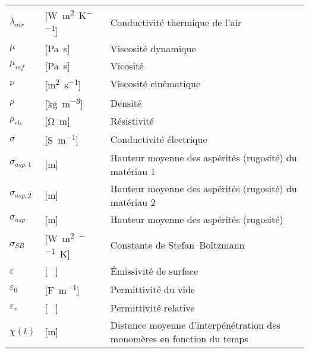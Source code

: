 \begin{longtable}{l p{2.5cm} p{4in}}
	$\lambda_{air}$   & [\si{\watt\per\square\metre\per\kelvin}]            & Conductivité thermique de l'air                              \\
	$\mu$             & [\si{\pascal\second}]                               & Viscosité dynamique                                          \\
	$\mu_{mf}$        & [\si{\pascal\second}]                               & Vicosité                                                     \\
	$\nu$             & [\si{\square\metre\per\second}]                     & Viscosité cinématique                                        \\
	$\rho$            & [\si{\kilogram\per\cubic\metre}]                    & Densité                                                      \\
	$\rho_{ele}$      & [\si{\ohm\metre}]                                   & Résistivité                                                  \\
	$\sigma$          & [\si{\siemens\per\metre}]                           & Conductivité électrique                                      \\
	$\sigma_{asp,1}$  & [\si{\metre}]                                       & Hauteur moyenne des aspérités (rugosité) du matériau 1       \\
	$\sigma_{asp,2}$  & [\si{\metre}]                                       & Hauteur moyenne des aspérités (rugosité) du matériau 2       \\
	$\sigma_{asp}$    & [\si{\metre}]                                       & Hauteur moyenne des aspérités (rugosité)                     \\
	$\sigma_{SB}$     & [\si{\watt\per\square\metre\per\raiseto{4}\kelvin}] & Constante de Stefan–Boltzmann                                \\
	$\varepsilon$     & [ \ ]                                               & Émissivité de surface                                        \\
	$\varepsilon_0$   & [\si{\farad\per\metre}]                             & Permittivité du vide                                         \\
	$\varepsilon_r$   & [ \ ]                                               & Permittivité relative                                        \\
	$\chi(t)$         & [\si{\metre}]                                       & Distance moyenne d'interpénétration des monomères en fonction du temps                                                
\end{longtable}
